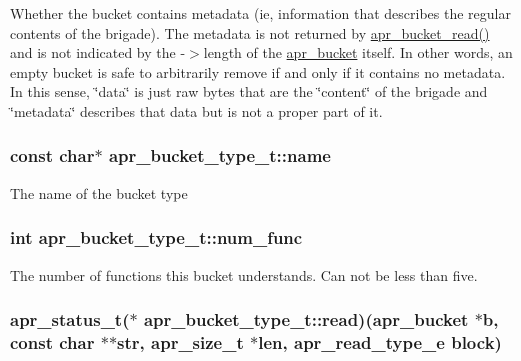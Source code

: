 Whether the bucket contains metadata (ie, information that describes the regular contents of the brigade). The metadata is not returned by \hyperlink{group___a_p_r___util___bucket___brigades_gae44ae938c6c60e148430fdb098dcf28f}{apr\-\_\-bucket\-\_\-read()} and is not indicated by the -\/$>$length of the \hyperlink{structapr__bucket}{apr\-\_\-bucket} itself. In other words, an empty bucket is safe to arbitrarily remove if and only if it contains no metadata. In this sense, \char`\"{}data\char`\"{} is just raw bytes that are the \char`\"{}content\char`\"{} of the brigade and \char`\"{}metadata\char`\"{} describes that data but is not a proper part of it. \hypertarget{structapr__bucket__type__t_ac6d779be45de214c6abd2cc205c48901}{
\subsubsection[{name}]{\setlength{\rightskip}{0pt plus 5cm}const char$\ast$ apr\-\_\-bucket\-\_\-type\-\_\-t\-::name}}\label{structapr__bucket__type__t_ac6d779be45de214c6abd2cc205c48901}
The name of the bucket type \hypertarget{structapr__bucket__type__t_ad4bd2ffb03cb2f5f3b3941ce20468038}{
\subsubsection[{num\-\_\-func}]{\setlength{\rightskip}{0pt plus 5cm}int apr\-\_\-bucket\-\_\-type\-\_\-t\-::num\-\_\-func}}\label{structapr__bucket__type__t_ad4bd2ffb03cb2f5f3b3941ce20468038}
The number of functions this bucket understands. Can not be less than five. \hypertarget{structapr__bucket__type__t_a8e9f3f5b2a5513691f3cea130a1aa54b}{
\subsubsection[{read}]{\setlength{\rightskip}{0pt plus 5cm}apr\-\_\-status\-\_\-t($\ast$ apr\-\_\-bucket\-\_\-type\-\_\-t\-::read)({\bf apr\-\_\-bucket} $\ast$b, const char $\ast$$\ast$str, apr\-\_\-size\-\_\-t $\ast$len, {\bf apr\-\_\-read\-\_\-type\-\_\-e} block)}}\label{structapr__bucket__type__t_a8e9f3f5b2a5513691f3cea130a1aa54b}

